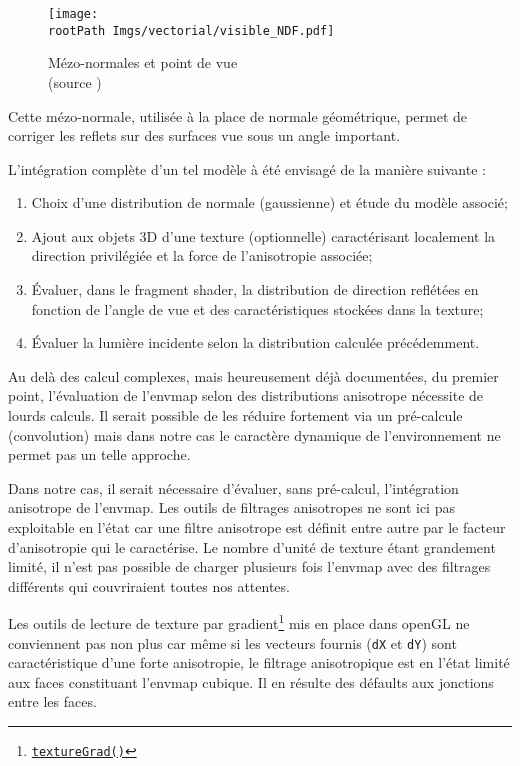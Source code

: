 \documentclass[10pt,a4paper,twoside, twocolumn]{report}
\newcommand*{\rootPath}{../}
\begin{document}
\begin{figure}\centering
	\texttt{[image: \\rootPath Imgs/vectorial/visible\_NDF.pdf]}
	\caption{Mézo-normales et point de vue\\(source \cite{Dupuy2012})}
	\label{fig:svg:mezonormales}
\end{figure}

Cette mézo-normale, utilisée à la place de normale géométrique, permet de corriger les reflets sur des surfaces vue sous un angle important.

L’intégration complète d'un tel modèle à été envisagé de la manière suivante :
\begin{enumerate}
	\item Choix d'une distribution de normale (gaussienne) et étude du modèle associé;
	\item Ajout aux objets 3D d'une texture (optionnelle) caractérisant localement la direction privilégiée et la force de l'anisotropie associée;
	\item Évaluer, dans le fragment shader, la distribution de direction reflétées en fonction de l'angle de vue et des caractéristiques stockées dans la texture;
	\item Évaluer la lumière incidente selon la distribution calculée précédemment.
\end{enumerate}

Au delà des calcul complexes, mais heureusement déjà documentées, du premier point\cite{Heitz2013a}, l'évaluation de l'envmap selon des distributions anisotrope nécessite de lourds calculs.
Il serait possible de les réduire fortement via un pré-calcule (convolution) mais dans notre cas le caractère dynamique de l'environnement ne permet pas un telle approche.

Dans notre cas, il serait nécessaire d'évaluer, sans pré-calcul, l’intégration anisotrope de l'envmap.
Les outils de filtrages anisotropes ne sont ici pas exploitable en l’état car une filtre anisotrope est définit entre autre par le facteur d'anisotropie qui le caractérise. Le nombre d'unité de texture étant grandement limité, il n'est pas possible de charger plusieurs fois l'envmap avec des filtrages différents qui couvriraient toutes nos attentes.

Les outils de lecture de texture par gradient\footnote{\href{https://www.opengl.org/sdk/docs/man/html/textureGrad.xhtml}{\texttt{textureGrad()}}} mis en place dans openGL ne conviennent pas non plus car même si les vecteurs fournis (\texttt{dX} et \texttt{dY}) sont caractéristique d'une forte anisotropie, le filtrage anisotropique est en l'état limité aux faces constituant l'envmap cubique. Il en résulte des défaults aux jonctions entre les faces.
\end{document}
